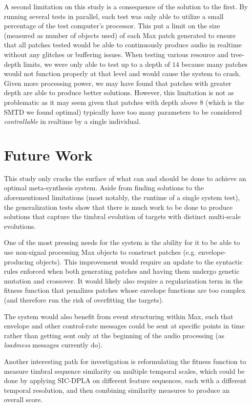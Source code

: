 \documentclass[12pt]{report} 	%
\numberwithin{figure}{chapter}
\numberwithin{table}{chapter}
\numberwithin{equation}{chapter}
\begin{document}
\begin{flushleft}
A second limitation on this study is a consequence of the solution to the first. By running several tests in parallel, each test was only able to utilize a small percentage of the test computer's processor. This put a limit on the size (measured as number of objects used) of each Max patch generated to ensure that all patches tested would be able to continuously produce audio in realtime without any glitches or buffering issues. When testing various resource and tree-depth limits, we were only able to test up to a depth of $14$ because many patches would not function properly at that level and would cause the system to crash. Given more processing power, we may have found that patches with greater depth are able to produce better solutions. However, this limitation is not as problematic as it may seem given that patches with depth above $8$ (which is the SMTD we found optimal) typically have too many parameters to be considered \textit{controllable} in realtime by a single individual.

\section{Future Work}
This study only cracks the surface of what can and should be done to achieve an optimal meta-synthesis system. Aside from finding solutions to the aforementioned limitations (most notably, the runtime of a single system test), the generalization tests show that there is much work to be done to produce solutions that capture the timbral evolution of targets with distinct multi-scale evolutions.

One of the most pressing needs for the system is the ability for it to be able to use non-signal processing Max objects to construct patches (e.g. envelope-producing objects). This improvement would require an update to the syntactic rules enforced when both generating patches and having them undergo genetic mutation and crossover. It would likely also require a regularization term in the fitness function that penalizes patches whose envelope functions are too complex (and therefore run the risk of overfitting the targets). 

The system would also benefit from event structuring within Max, such that envelope and other control-rate messages could be sent at specific points in time rather than getting sent only at the beginning of the audio processing (as \textit{loadmess} messages currently do).

Another interesting path for investigation is reformulating the fitness function to measure timbral sequence similarity on multiple temporal scales, which could be done by applying SIC-DPLA on different feature sequences, each with a different temporal resolution, and then combining similarity measures to produce an overall score.


\end{flushleft}
\end{document}
